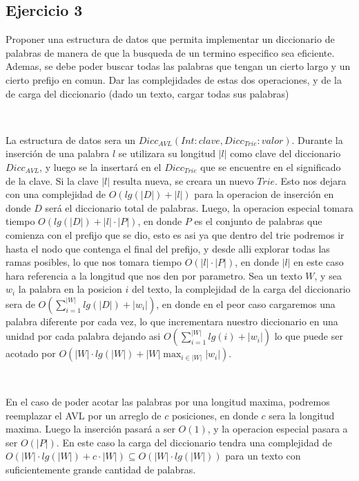 \documentclass[10pt, a4paper]{article}
\begin{document}
\subsection*{Ejercicio 3}

Proponer una estructura de datos que permita implementar un diccionario de palabras de manera de que la busqueda de un termino especifico sea eficiente. Ademas, se debe poder buscar todas las palabras que tengan un cierto largo y un cierto prefijo en comun. Dar las complejidades de estas dos operaciones, y de la de carga del diccionario (dado un texto, cargar todas sus palabras)

~

La estructura de datos sera un $Dicc_{AVL}(Int: clave, Dicc_{Trie}: valor)$. Durante la inserci\'on de una palabra $l$ se utilizara su longitud $|l|$ como clave del diccionario $Dicc_{AVL}$, y luego se la insertar\'a en el $Dicc_{Trie}$ que se encuentre en el significado de la clave. Si la clave $|l|$ resulta nueva, se creara un nuevo $Trie$. Esto nos dejara con una complejidad de $O(lg(|D|)+|l|)$ para la operacion de inserci\'on en donde $D$ ser\'a el diccionario total de palabras. Luego, la operacion especial tomara tiempo $O(lg(|D|)+|l| \cdot |P|)$, en donde $P$ es el conjunto de palabras que comienza con el prefijo que se dio, esto es asi ya que dentro del trie podremos ir hasta el nodo que contenga el final del prefijo, y desde alli explorar todas las ramas posibles, lo que nos tomara tiempo $O(|l| \cdot |P|)$, en donde $|l|$ en este caso hara referencia a la longitud que nos den por parametro. Sea un texto $W$, y sea $w_i$ la palabra en la posicion $i$ del texto, la complejidad de la carga del 
diccionario 
sera de $O(\sum_{i=1}^{|W|}lg(|D|)+|w_i|)$, en donde en el peor caso cargaremos una palabra diferente por cada vez, lo que incrementara nuestro diccionario en una unidad por cada palabra dejando asi $O(\sum_{i=1}^{|W|}lg(i)+|w_i|)$ lo que puede ser acotado por $O(|W|\cdot lg(|W|)+ |W| \max_{i \in |W|}|w_i|)$.

~

En el caso de poder acotar las palabras por una longitud maxima, podremos reemplazar el AVL por un arreglo de $c$ posiciones, en donde $c$ sera la longitud maxima. Luego la inserci\'on pasar\'a a ser $O(1)$, y la operacion especial pasara a ser $O(|P|)$. En este caso la carga del diccionario tendra una complejidad de $O(|W|\cdot lg(|W|)+ c \cdot |W|) \subseteq O(|W| \cdot lg(|W|))$ para un texto con suficientemente grande cantidad de palabras.
\end{document}

